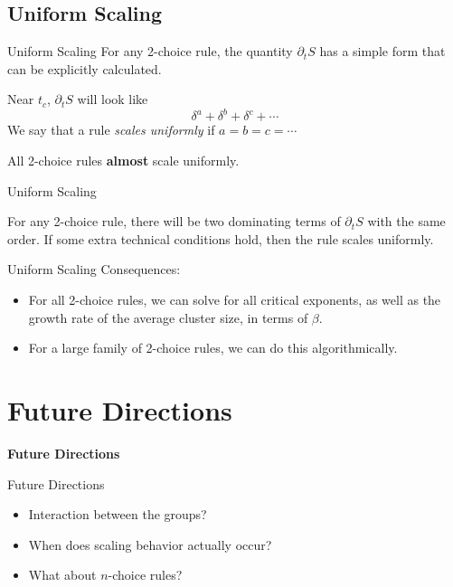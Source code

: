 \documentclass{beamer}
\begin{document}
\subsection{Uniform Scaling}

\begin{frame}{Uniform Scaling}
	For any 2-choice rule, the quantity $\partial_{t}{S} $ has a simple form that can be explicitly calculated.
	\vspace{5mm}

	Near $t_c$, $\partial_t S$ will look like
	\[
	\delta^{a}+\delta^{b}+\delta^{c}+\cdots
	\] 
	We say that a rule \textit{scales uniformly} if $a=b=c=\cdots$
	\vspace{5mm}
	
	\pause
	All 2-choice rules \textbf{almost} scale uniformly.
\end{frame}

\begin{frame}{Uniform Scaling}
	\begin{theorem}
		For any 2-choice rule, there will be two dominating terms of $\partial_t S$ with the same order. If some extra technical conditions hold, then the rule scales uniformly.
	\end{theorem}
\end{frame}

\begin{frame}{Uniform Scaling}
	Consequences:
	\begin{itemize}
		\item For all 2-choice rules, we can solve for all critical exponents, as well as the growth rate of the average cluster size, in terms of $\beta$.
		\item For a large family of 2-choice rules, we can do this algorithmically.
	\end{itemize}
\end{frame}

\section{Future Directions}

{
\begin{frame}
        \bfseries
        {\color{white}
                \huge Future Directions
        }
\end{frame}
}

\begin{frame}{Future Directions}
	\begin{itemize}
		\item Interaction between the groups?
		\item When does scaling behavior actually occur?
		\item What about $n$-choice rules?
	\end{itemize}
\end{frame}
\end{document}
